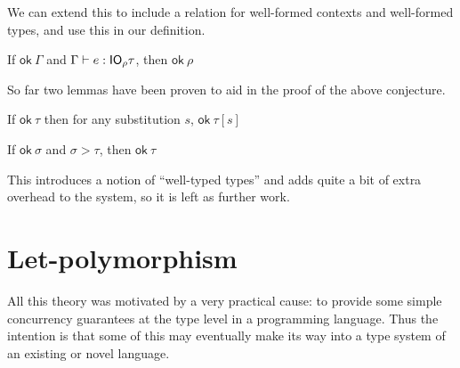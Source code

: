 We can extend this to include a relation for well-formed contexts and
well-formed types, and use this in our definition. 


\begin{conjecture}
  If $\textsf{ok} \ \Gamma$ and $\Gamma \vdash e : \mathsf{IO}_\rho \tau$, then $\textsf{ok} \ \rho$
\end{conjecture}
So far two lemmas have been proven to aid in the proof of the above
conjecture.
\begin{lemma}
  If $\textsf{ok} \ \tau$ then for any substitution $s$, $\textsf{ok} \ \tau[s]$
\end{lemma}
\begin{lemma}
  If $\textsf{ok} \ \sigma$ and $\sigma > \tau$, then $\textsf{ok} \ \tau$
\end{lemma}

This introduces a notion of ``well-typed types'' and adds quite a bit
of extra overhead to the system, so it is left as further work.

\section{Let-polymorphism}
All this theory was motivated by a very practical cause: to provide
some simple concurrency guarantees at the type level in a programming
language. Thus the intention is that some of this may eventually make
its way into a type system of an existing or novel language.

